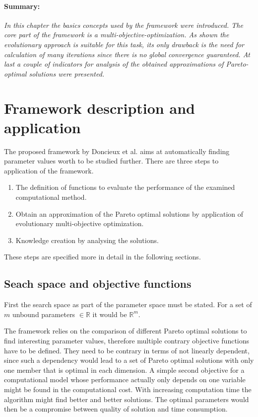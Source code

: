 \documentclass[12pt,twoside]{article}
\theoremstyle{plain}
\theoremstyle{definition}
\theoremstyle{remark}
\begin{document}
\paragraph{Summary:}
\textit{
	In this chapter the basics concepts used by the framework were introduced.
	The core part of the framework is a multi-objective-optimization. 
	As shown the evolutionary approach is suitable for this task, its only drawback is the need for calculation of many iterations since there is no global convergence guaranteed.
	At last a couple of indicators for analysis of the obtained approximations of Pareto-optimal solutions were presented.
}

\section{Framework description and application}
\label{sec:model}
The proposed framework by Doncieux et al. \cite{doncieux2015multi} aims at automatically finding parameter values worth to be studied further.
There are three steps to application of the framework.
\begin{enumerate}
	\item The definition of functions to evaluate the performance of the examined computational method.
	\item Obtain an approximation of the Pareto optimal solutions by application of evolutionary multi-objective optimization.
	\item Knowledge creation by analysing the solutions.
\end{enumerate}
These steps are specified more in detail in the following sections.

\subsection{Seach space and objective functions}
First the search space as part of the parameter space must be stated. For a set of $m$ unbound parameters $\in \mathbb{R}$ it would be $\mathbb{R}^m$. 

The framework relies on the comparison of different Pareto optimal solutions to find interesting parameter values, therefore multiple contrary objective functions have to be defined.
They need to be contrary in terms of not linearly dependent, since such a dependency would lead to a set of Pareto optimal solutions with only one member that is optimal in each dimension.
A simple second objective for a computational model whose performance actually only depends on one variable might be found in the computational cost.
With increasing computation time the algorithm might find better and better solutions. The optimal parameters would then be a compromise between quality of solution and time consumption.
\end{document}
